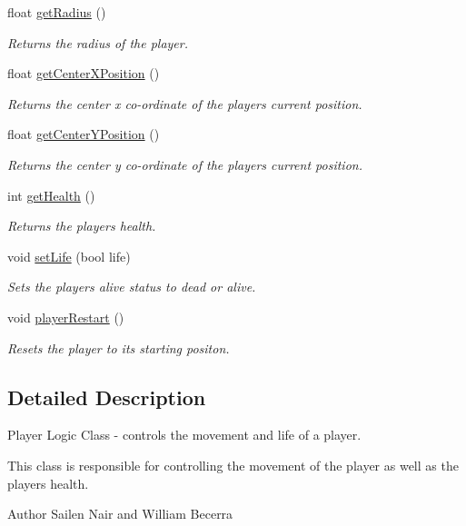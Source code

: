 \begin{DoxyCompactItemize}
float \hyperlink{class_player_logic_a2ca2c54d1e07bfc40a08b5c55403af3a}{get\+Radius} ()
\begin{DoxyCompactList}\small\item\em Returns the radius of the player. \end{DoxyCompactList}\item 
float \hyperlink{class_player_logic_a6bdec8d007701c16a3cbb87e7fdfe0e6}{get\+Center\+X\+Position} ()
\begin{DoxyCompactList}\small\item\em Returns the center x co-\/ordinate of the player\textquotesingle{}s current position. \end{DoxyCompactList}\item 
float \hyperlink{class_player_logic_ad7b9048aee0c7b58443055f37f871537}{get\+Center\+Y\+Position} ()
\begin{DoxyCompactList}\small\item\em Returns the center y co-\/ordinate of the player\textquotesingle{}s current position. \end{DoxyCompactList}\item 
int \hyperlink{class_player_logic_aa13b870627a1d38cd1c633ac8012e5af}{get\+Health} ()
\begin{DoxyCompactList}\small\item\em Returns the players health. \end{DoxyCompactList}\item 
void \hyperlink{class_player_logic_a3139e107a0eb76e7307f8657818b3007}{set\+Life} (bool life)
\begin{DoxyCompactList}\small\item\em Sets the players alive status to dead or alive. \end{DoxyCompactList}\item 
void \hyperlink{class_player_logic_aaaf0e8356e5af9753015960be7727724}{player\+Restart} ()
\begin{DoxyCompactList}\small\item\em Resets the player to its starting positon. \end{DoxyCompactList}\end{DoxyCompactItemize}


\subsection{Detailed Description}
Player Logic Class -\/ controls the movement and life of a player. 

This class is responsible for controlling the movement of the player as well as the players health. \begin{DoxyAuthor}{Author}
Sailen Nair and William Becerra 
\end{DoxyAuthor}


